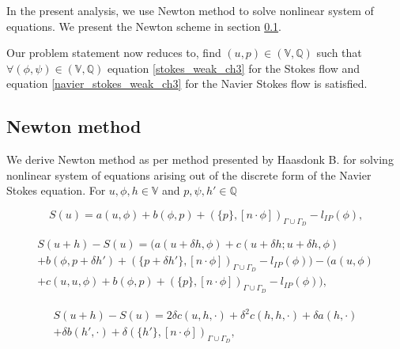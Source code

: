 \documentclass[a4paper,twoside,openright]{book}
\begin{document}
In the present analysis, we use Newton method to solve nonlinear system of equations. We present the Newton scheme in section \ref{newton_method}. 

Our problem statement now reduces to, find $(u,p) \in (\mathbb{V},\mathbb{Q})$ such that $\forall (\phi,\psi) \in (\mathbb{V},\mathbb{Q})$ equation \ref{stokes_weak_ch3} for the Stokes flow and equation \ref{navier_stokes_weak_ch3} for the Navier Stokes flow is satisfied.

\subsection{Newton method} \label{newton_method}

We derive Newton method as per method presented by Haasdonk B. \cite{Haasdonk} for solving nonlinear system of equations arising out of the discrete form of the Navier Stokes equation. For $u, \phi , h \in \mathbb{V}$ and $p, \psi , h' \in \mathbb{Q}$ \\
\begin{flushleft}
\begin{equation}
S(u) = a(u,\phi) + b(\phi,p) + (\{p\},[n\cdot \phi])_{\Gamma \cup \Gamma_D} - l_{IP}(\phi) \textrm{,}
\end{equation}
\end{flushleft}

\begin{flushleft}
\begin{equation}
\begin{split}
S(u+h) - S(u) = (a(u+\delta h,\phi) + c(u + \delta h;u + \delta h,\phi)\\ + b(\phi,p+\delta h') + (\{p+\delta h'\},[n\cdot \phi])_{\Gamma \cup \Gamma_D} - l_{IP}(\phi)) - (a(u,\phi)\\ + c(u,u,\phi) + b(\phi,p) + (\{p\},[n\cdot \phi])_{\Gamma \cup \Gamma_D} - l_{IP}(\phi)) \textrm{,}
\end{split}
\end{equation}
\end{flushleft}

\begin{flushleft}
\begin{equation}
\begin{split}
S(u+h) - S(u) = 2\delta c(u,h,\cdot) + \delta^2 c(h,h,\cdot) + \delta a(h,\cdot)\\ + \delta b(h',\cdot) + \delta (\{h'\},[n\cdot \phi])_{\Gamma \cup \Gamma_D} \textrm{,}
\end{split}
\end{equation}
\end{flushleft}
\end{document}
